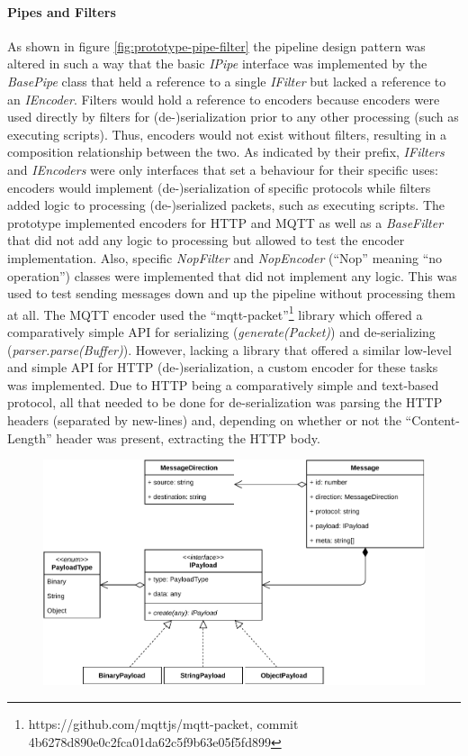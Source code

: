 \paragraph{Pipes and Filters} As shown in figure \ref{fig:prototype-pipe-filter} the pipeline design pattern was altered in such a way that the basic \emph{IPipe} interface was implemented by the \emph{BasePipe} class that held a reference to a single \emph{IFilter} but lacked a reference to an \emph{IEncoder}. Filters would hold a reference to encoders because encoders were used directly by filters for (de-)serialization prior to any other processing (such as executing scripts). Thus, encoders would not exist without filters, resulting in a composition relationship between the two. As indicated by their prefix, \emph{IFilters} and \emph{IEncoders} were only interfaces that set a behaviour for their specific uses: encoders would implement (de-)serialization of specific protocols while filters added logic to processing (de-)serialized packets, such as executing scripts. The prototype implemented encoders for \ac{HTTP} and \ac{MQTT} as well as a \emph{BaseFilter} that did not add any logic to processing but allowed to test the encoder implementation. Also, specific \emph{NopFilter} and \emph{NopEncoder} (\enquote{Nop} meaning \enquote{no operation}) classes were implemented that did not implement any logic. This was used to test sending messages down and up the pipeline without processing them at all. The \ac{MQTT} encoder used the \enquote{mqtt-packet}\footnote{https://github.com/mqttjs/mqtt-packet, commit 4b6278d890e0c2fca01da62c5f9b63e05f5fd899} library which offered a comparatively simple API for serializing (\emph{generate(Packet)}) and de-serializing (\emph{parser.parse(Buffer)}). However, lacking a library that offered a similar low-level and simple API for \ac{HTTP} (de-)serialization, a custom encoder for these tasks was implemented. Due to \ac{HTTP} being a comparatively simple and text-based protocol, all that needed to be done for de-serialization was parsing the \ac{HTTP} headers (separated by new-lines) and, depending on whether or not the \enquote{Content-Length} header was present, extracting the \ac{HTTP} body.

\begin{figure}[h]
    \centering
    \includegraphics[width=14cm]{img/ch04/prototype/message-payload.pdf}
    \label{fig:prototype-message-payload}
\end{figure}

